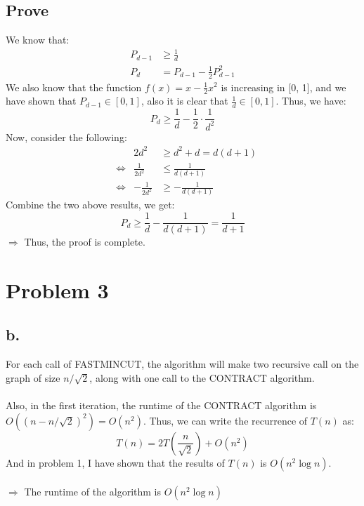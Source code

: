 \documentclass{article}
\begin{document}
\subsection*{Prove}
We know that:
\[
\begin{aligned}
P_{d-1} &\geq \frac{1}{d} \\
P_d &= P_{d-1} - \frac{1}{2}P_{d-1}^2
\end{aligned}
\]
We also know that the function $f(x) = x - \frac{1}{2}x^2$ is increasing in [0, 1], and we have shown that $P_{d-1} \in [0, 1]$, also it is clear that $\frac{1}{d} \in [0, 1]$. Thus, we have:
\[
P_d \geq \frac{1}{d} - \frac{1}{2} \cdot \frac{1}{d^2}
\]
Now, consider the following:
\[
\begin{aligned}
&                      & 2d^2 &\geq d^2 + d = d(d + 1) \\
&\Leftrightarrow& \frac{1}{2d^2} &\leq \frac{1}{d(d+1)} \\
&\Leftrightarrow& -\frac{1}{2d^2} &\geq -\frac{1}{d(d+1)}
\end{aligned}
\]
Combine the two above results, we get:
\[
P_d \geq \frac{1}{d} - \frac{1}{d(d+1)} = \frac{1}{d+1}
\]
$\Longrightarrow$ Thus, the proof is complete.


\pagebreak
\section*{Problem 3}
\subsection*{b.}
For each call of FASTMINCUT, the algorithm will make two recursive call on the graph of size $n/\sqrt{2}$, along with one call to the CONTRACT algorithm. \\\\
Also, in the first iteration, the runtime of the CONTRACT algorithm is $O(( n - n/\sqrt{2})^2) = O(n^2)$. Thus, we can write the recurrence of $T(n)$ as:
\[
T(n) = 2T \left( \frac{n}{\sqrt{2}} \right) + O(n^2)
\]
And in problem 1, I have shown that the results of $T(n)$ is $O(n^{2}\log{n})$. \\\\
$\Rightarrow$ The runtime of the algorithm is $O(n^{2}\log{n})$
\end{document}
